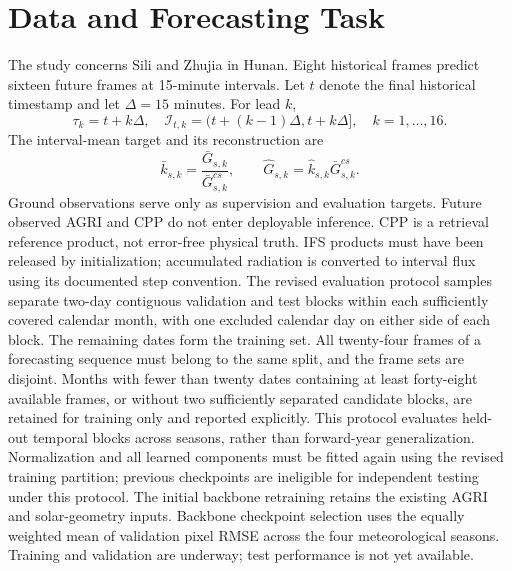 \documentclass[11pt]{article}
\begin{document}
\section{Data and Forecasting Task}
The study concerns Sili and Zhujia in Hunan. Eight historical frames predict sixteen future frames at 15-minute intervals. Let $t$ denote the final historical timestamp and let $\Delta=15$ minutes. For lead $k$,
\begin{equation}
\tau_k=t+k\Delta,\quad \mathcal I_{t,k}=(t+(k-1)\Delta,t+k\Delta],\quad k=1,\ldots,16.
\end{equation}
The interval-mean target and its reconstruction are
\begin{equation}
\bar k_{s,k}=\frac{\bar G_{s,k}}{\bar G^{cs}_{s,k}},\qquad
\widehat G_{s,k}=\widehat k_{s,k}\bar G^{cs}_{s,k}.
\end{equation}
Ground observations serve only as supervision and evaluation targets. Future observed AGRI and CPP do not enter deployable inference. CPP is a retrieval reference product, not error-free physical truth. IFS products must have been released by initialization; accumulated radiation is converted to interval flux using its documented step convention.
The revised evaluation protocol samples separate two-day contiguous validation and test blocks within each sufficiently covered calendar month, with one excluded calendar day on either side of each block. The remaining dates form the training set. All twenty-four frames of a forecasting sequence must belong to the same split, and the frame sets are disjoint. Months with fewer than twenty dates containing at least forty-eight available frames, or without two sufficiently separated candidate blocks, are retained for training only and reported explicitly. This protocol evaluates held-out temporal blocks across seasons, rather than forward-year generalization. Normalization and all learned components must be fitted again using the revised training partition; previous checkpoints are ineligible for independent testing under this protocol. The initial backbone retraining retains the existing AGRI and solar-geometry inputs. Backbone checkpoint selection uses the equally weighted mean of validation pixel RMSE across the four meteorological seasons. Training and validation are underway; test performance is not yet available.
\end{document}
